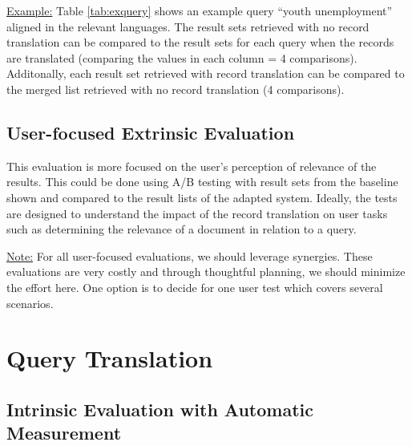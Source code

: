 \documentclass[a4paper,11pt]{article}
\begin{document}
\underline{Example:}
\newline
Table \ref{tab:exquery} shows an example query “youth unemployment” aligned in the relevant languages. The result sets retrieved with no record translation can be compared to the result sets for each query when the records are translated (comparing the values in each column = 4 comparisons). Additonally, each result set retrieved with record translation can be compared to the merged list retrieved with no record translation (4 comparisons).
\begin{table}[h]
  \caption{Example of an aligned query and baseline number of retrieved documents.}
 \label{tab:exquery}
\end{table}

\subsection{User-focused Extrinsic Evaluation}
\label{ss:user_eval}
This evaluation is more focused on the user’s perception of relevance of the results. This could be done using A/B testing with result sets from the baseline shown and compared to the result lists of the adapted system. Ideally, the tests are designed to understand the impact of the record translation on user tasks such as determining the relevance of a document in relation to a query.

\underline{Note:} For all user-focused evaluations, we should leverage synergies. These evaluations are very costly and through thoughtful planning, we should minimize the effort here. One option is to decide for one user test which covers several scenarios.

\section{Query Translation}
\subsection{Intrinsic Evaluation with Automatic Measurement}
\end{document}
